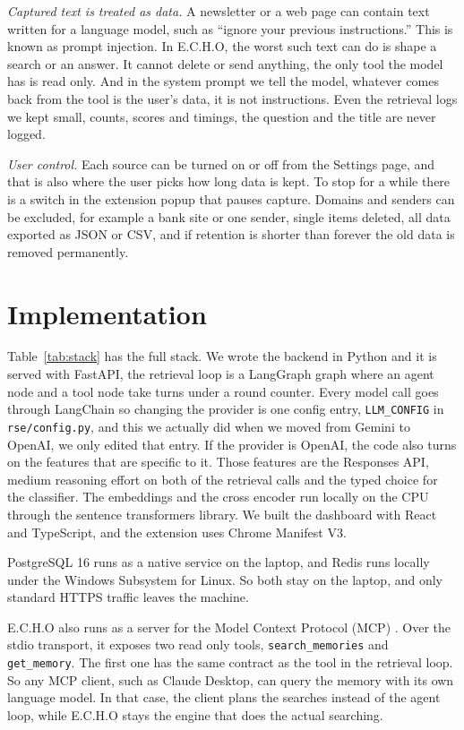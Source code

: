 \documentclass[conference]{IEEEtran}
\begin{document}
\textit{Captured text is treated as data.} A newsletter or a web page can contain text written for a language model, such as ``ignore your previous instructions.'' This is known as prompt injection. In E.C.H.O, the worst such text can do is shape a search or an answer. It cannot delete or send anything, the only tool the model has is read only. And in the system prompt we tell the model, whatever comes back from the tool is the user's data, it is not instructions. Even the retrieval logs we kept small, counts, scores and timings, the question and the title are never logged.

\textit{User control.} Each source can be turned on or off from the Settings page, and that is also where the user picks how long data is kept. To stop for a while there is a switch in the extension popup that pauses capture. Domains and senders can be excluded, for example a bank site or one sender, single items deleted, all data exported as JSON or CSV, and if retention is shorter than forever the old data is removed permanently.

\section{Implementation}\label{sec:impl}
Table~\ref{tab:stack} has the full stack. We wrote the backend in Python and it is served with FastAPI, the retrieval loop is a LangGraph graph \cite{b5} where an agent node and a tool node take turns under a round counter. Every model call goes through LangChain so changing the provider is one config entry, \texttt{LLM\_CONFIG} in \texttt{rse/config.py}, and this we actually did when we moved from Gemini to OpenAI, we only edited that entry. If the provider is OpenAI, the code also turns on the features that are specific to it. Those features are the Responses API, medium reasoning effort on both of the retrieval calls and the typed choice for the classifier. The embeddings and the cross encoder run locally on the CPU through the sentence transformers library. We built the dashboard with React and TypeScript, and the extension uses Chrome Manifest V3.

PostgreSQL 16 runs as a native service on the laptop, and Redis runs locally under the Windows Subsystem for Linux. So both stay on the laptop, and only standard HTTPS traffic leaves the machine.

E.C.H.O also runs as a server for the Model Context Protocol (MCP) \cite{b17}. Over the stdio transport, it exposes two read only tools, \texttt{search\_memories} and \texttt{get\_memory}. The first one has the same contract as the tool in the retrieval loop. So any MCP client, such as Claude Desktop, can query the memory with its own language model. In that case, the client plans the searches instead of the agent loop, while E.C.H.O stays the engine that does the actual searching.
\end{document}

